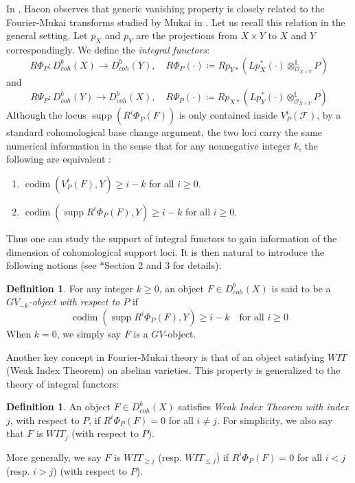 \documentclass[11pt]{amsart}
\theoremstyle{definition}
\newtheorem{definition}[equation]{Definition}
\theoremstyle{plain}
\newcommand{\F}{\mathcal F}
\renewcommand{\O}{\mathcal O}
\newcommand{\LL}{\mathbb L}
\DeclareMathOperator{\supp}{supp}
\DeclareMathOperator{\codim}{codim}
\newcounter{intro}
\begin{document}
In \cite{Hacon-gen_vanishing}, Hacon observes that generic vanishing property is closely related to the Fourier-Mukai transforms studied by Mukai in \cite{Mukai_transform}. Let us recall this relation in the general setting. Let $p_X$ and $p_Y$ are the projections from $X\times Y$ to $X$ and $Y$ correspondingly. We define the \textit{integral functors}:
\[R\Phi_P:D_{coh}^b(X) \to D_{coh}^b(Y), \quad R\Phi_P(\cdot) \coloneqq Rp_{Y*}(Lp_X^* (\cdot) \otimes^\LL_{\O_{X\times Y}} P)\]
and 
\[R\Psi_P:D_{coh}^b(Y) \to D_{coh}^b(X), \quad R\Psi_P(\cdot) \coloneqq Rp_{X*}(Lp_Y^*(\cdot) \otimes^{\LL}_{\O_{X\times Y}} P)\]
Although the locus $\supp(R^i\Phi_{P}(F))$ is only contained inside $V^i_P(\F)$, by a standard cohomological base change argument, the two loci carry the same numerical information in the sense that for any nonnegative integer $k$, the following are equivalent \cite[Lemma 3.6]{PP_Generic_Vanishing}:
\begin{enumerate}
    \item $\codim(V^i_P(F), Y) \ge i-k$ for all $i \ge 0$.
    \item $\codim(\supp R^i\Phi_{P}(F), Y) \ge i-k$ for all $i\ge 0$. 
\end{enumerate}
Thus one can study the support of integral functors to gain information of the dimension of cohomological support loci. It is then natural to introduce the following notions (see \cite{PP_Generic_Vanishing}*{Section 2 and 3} for details):

\begin{definition}                                   
    For any integer $k\ge 0$, an object $F\in D_{coh}^b(X)$ is said to be a \textit{$GV_{-k}$-object with respect to $P$} if                             
    \[\codim(\supp R^i\Phi_{P}(F), Y) \ge i-k \quad \text{for all } i\ge 0\]        
    When $k=0$, we simply say $F$ is a $GV$-object.                            
\end{definition}                       

Another key concept in Fourier-Mukai theory is that of an object satisfying $WIT$ (Weak Index Theorem) on abelian varieties. This property is generalized to the theory of integral functors:

\begin{definition}                  
    An object $F \in D_{coh}^b(X)$ satisfies \textit{Weak Index Theorem with index $j$}, with respect to $P$, if $R^i\Phi_P(F) = 0$ for all $i\neq j$. For simplicity, we also say that $F$ is $WIT_{j}$ (with respect to $P$).             
    
    More generally, we say $F$ is $WIT_{\ge j}$ (resp. $WIT_{\le j}$) if $R^i\Phi_P(F) = 0$ for all $i<j$ (resp. $i>j$) (with respect to $P$).                
\end{definition}                   
\end{document}
